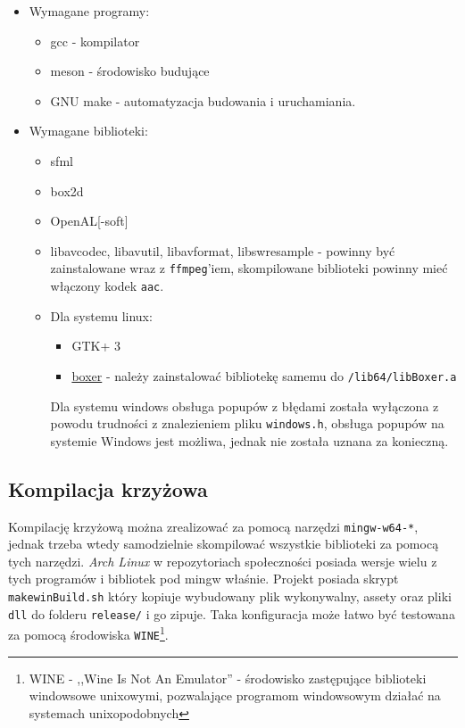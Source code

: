 \documentclass[a4paper,11pt]{article}
\begin{document}
\begin{itemize}
    \item Wymagane programy:
    \begin{itemize}
        \item gcc - kompilator
        \item meson - środowisko budujące
        \item GNU make - automatyzacja budowania i uruchamiania.
    \end{itemize}
    \item Wymagane biblioteki:
    \begin{itemize}
        \item sfml
        \item box2d
        \item OpenAL[-soft]
        \item libavcodec, libavutil, libavformat, libswresample - powinny być zainstalowane wraz z \texttt{ffmpeg}'iem, skompilowane biblioteki powinny mieć włączony kodek \texttt{aac}.
        \item Dla systemu linux:
        \begin{itemize}
            \item GTK+ 3
            \item \href{https://github.com/aaronmjacobs/Boxer}{boxer} - należy zainstalować bibliotekę samemu do \texttt{/lib64/libBoxer.a}
        \end{itemize}
        Dla systemu windows obsługa popupów z błędami została wyłączona z powodu trudności z znalezieniem pliku \texttt{windows.h}, obsługa popupów na systemie Windows jest możliwa, jednak nie została uznana za konieczną.
    \end{itemize}
\end{itemize}

\subsection*{Kompilacja krzyżowa}

Kompilację krzyżową można zrealizować za pomocą narzędzi \texttt{mingw-w64-*}, jednak trzeba wtedy samodzielnie skompilować wszystkie biblioteki za pomocą tych narzędzi. \emph{Arch Linux} w repozytoriach społeczności posiada wersje wielu z tych programów i bibliotek pod mingw właśnie. Projekt posiada skrypt \texttt{makewinBuild.sh} który kopiuje wybudowany plik wykonywalny, assety oraz pliki \texttt{dll} do folderu \texttt{release/} i go zipuje. Taka konfiguracja może łatwo być testowana za pomocą środowiska \texttt{WINE}\footnote{WINE - ,,Wine Is Not An Emulator'' - środowisko zastępujące biblioteki windowsowe unixowymi, pozwalające programom windowsowym działać na systemach unixopodobnych}.
\end{document}

